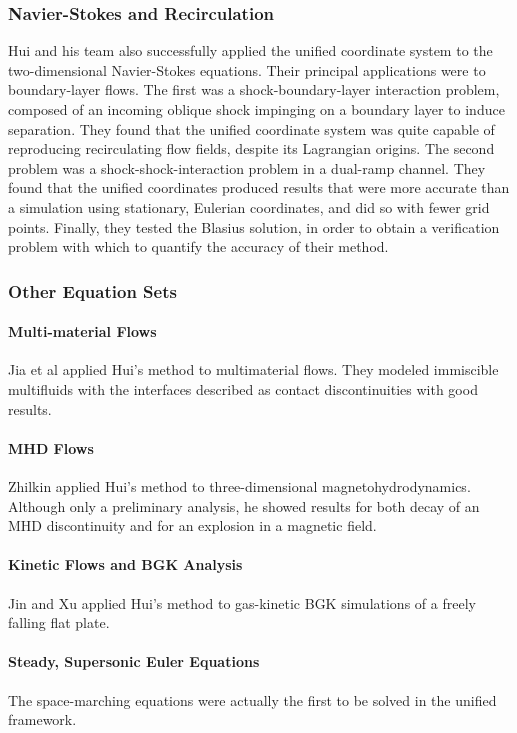 \documentclass[12pt,letterpaper]{article}
\begin{document}
\subsubsection{Navier-Stokes and Recirculation}
Hui and his team also successfully applied the unified coordinate 
system to the two-dimensional Navier-Stokes equations. Their principal 
applications were to boundary-layer flows. The first was a 
shock-boundary-layer interaction problem, composed of an incoming 
oblique shock impinging on a boundary layer to induce separation. 
They found that the unified coordinate system was quite 
capable of reproducing recirculating flow fields, despite its 
Lagrangian origins. The second problem was a shock-shock-interaction 
problem in a dual-ramp channel. They found that the unified 
coordinates produced results that were more accurate than a simulation 
using stationary, Eulerian coordinates, and did so with fewer grid 
points. Finally, they tested the Blasius%
solution, 
in order to obtain a verification problem with which to quantify the 
accuracy of their method. 
\subsubsection{Other Equation Sets}
\paragraph{Multi-material Flows}
Jia et al\cite{jia06} applied Hui's method to multimaterial
flows. They modeled immiscible multifluids with the interfaces
described as contact discontinuities with good results. 
\paragraph{MHD Flows}
Zhilkin\cite{zhilkin07} applied Hui's method to three-dimensional
magnetohydrodynamics. Although only a preliminary analysis, he showed
results for both decay of an MHD discontinuity and for an explosion in
a magnetic field.
\paragraph{Kinetic Flows and BGK Analysis}
Jin and Xu\cite{jin07}\cite{jin08} applied Hui's method to
gas-kinetic BGK simulations of a freely falling flat plate.
\paragraph{Steady, Supersonic Euler Equations}
The space-marching equations were actually the first to be solved in
the unified framework.
\end{document}
